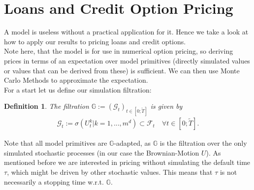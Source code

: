 \documentclass[12pt]{article}
\newtheorem{definition}[theorem]{Definition}
\begin{document}
	
	\pagebreak
	\section{Loans and Credit Option Pricing}
	A model is useless without a practical application for it. Hence we take a look at how to apply our results to pricing loans and credit options.\\
	Note here, that the model is for use in numerical option pricing, so deriving prices in terms of an expectation over model primitives (directly simulated values or values that can be derived from these) is sufficient. We can then use Monte Carlo Methods to approximate the expectation.\\
	For a start let us define our simulation filtration:
	\begin{definition}
		The filtration $\mathbb{G} := (\mathcal{G}_t)_{t\in\left[0;\tilde{T}\right]}$ is given by
		\begin{align*}
			\mathcal{G}_t := \sigma(U^k_t | k = 1, ..., m^d) \subset \mathcal{F}_t \quad \forall t \in  [0;\tilde{T}].
		\end{align*}
	\end{definition}
	Note that all model primitives are $\mathbb{G}$-adapted, as $\mathbb{G}$ is the filtration over the only simulated stochastic processes (in our case the Brownian-Motion $U$). As mentioned before we are interested in pricing without simulating the default time $\tau$, which might be driven by other stochastic values. This means that $\tau$ is not necessarily a stopping time w.r.t. $\mathbb{G}$.
	
\end{document}
